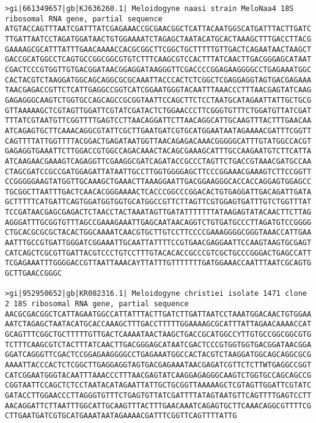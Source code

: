 \documentclass[11pt]{article}
\begin{document}
\begin{Verbatim}[commandchars=\\\{\}]
>gi|661349657|gb|KJ636260.1| Meloidogyne naasi strain MeloNaa4 18S ribosomal RNA gene, partial sequence
ATGTACCAGTTTAATCGATTTATCGAGAAACCGCGAACGGCTCATTACAATGGSCATGATTTACTTGATC
TTGATTAATCCTAGATGGATAACTGTGGAAAATCTAGAGCTAATACATGCACTAAAGCTTTGACCTTACG
GAAAAGCGCATTTATTTGAACAAAACCACGCGGCTTCGGCTGCTTTTTGTTGACTCAGAATAACTAAGCT
GACCGCATGGCCTCAGTGCCGGCGGCGTGTCTTTCAAGCGTCCACTTTATCAACTTGACGGGAGCATAAT
CGACTCCCGTGGTTGTGACGGATAACGGAGGATAAGGGTTCGACCCCGGAGAAGGGGCCTGAGAAATGGC
CACTACGTCTAAGGATGGCAGCAGGCGCGCAAATTACCCACTCTCGGCTCGAGGAGGTAGTGACGAGAAA
TAACGAGACCGTTCTCATTGAGGCCGGTCATCGGAATGGGTACAATTTAAACCCTTTAACGAGTATCAAG
GAGAGGGCAAGTCTGGTGCCAGCAGCCGCGGTAATTCCAGCTTCTCCTAATGCATAGAATTATTGCTGCG
GTTAAAAAGCTCGTAGTTGGATTCGTATCGATACTCTGGAACCCTTCGGGTGTTTCTGGATGTTATCGAT
TTTATCGTAATGTTCGGTTTTGAGTCCTTAACAGGATTCTTAACAGGCATTGCAAGTTTACTTTGAACAA
ATCAGAGTGCTTCAAACAGGCGTATTCGCTTGAATGATCGTGCATGGAATAATAGAAAACGATTTCGGTT
CAGTTTTATTGGTTTTACGGACTGAGATAATGGTTAACAGAGACAAACGGGGGCATTTGTATGGCCACGT
GAGAGGTGAAATTCTTGGACCGTGGCCAGACAAACTACAGCGAAAGCATTTGCCAAGAATGTCTTCATTA
ATCAAGAACGAAAGTCAGAGGTTCGAAGGCGATCAGATACCGCCCTAGTTCTGACCGTAAACGATGCCAA
CTAGCGATCCGCCGATGGAGATTATAATTGCCTTGGTGGGGAGCTTCCCGGAAACGAAAGTCTTCCGGTT
CCGGGGGAAGTATGGTTGCAAAGCTGAAACTTAAAGGAATTGACGGAAGGGCACCACCAGGAGTGGAGCC
TGCGGCTTAATTTGACTCAACACGGGAAAACTCACCCGGCCCGGACACTGTGAGGATTGACAGATTGATA
GCTTTTTCATGATTCAGTGGATGGTGGTGCATGGCCGTTCTTAGTTCGTGGAGTGATTTGTCTGGTTTAT
TCCGATAACGAGCGAGACTCTAACCTACTAAATAGTTGATATTTTTTTATAAGAGTATACAACTTCTTAG
AGGGATTTGCGGTGTTTAGCCGAAAGAAATTGAGCAATAACAGGTCTGTGATGCCCTTAGATGTCCGGGG
CTGCACGCGCGCTACACTGGCAAAATCAACGTGCTTGTCCTTCCCCGAAAGGGGCGGGTAAACCATTGAA
AATTTGCCGTGATTGGGATCGGAAATTGCAATTATTTTCCGTGAACGAGGAATTCCAAGTAAGTGCGAGT
CATCAGCTCGCGTTGATTACGTCCCTGTCCTTTGTACACACCGCCCGTCGCTGCCCGGGACTGAGCCATT
TCGAGAAATTTGGGGACCGTTAATTAAACAYTTATTTGTTTTTTTGATGGAAACCAATTTAATCGCAGTG
GCTTGAACCGGGC

>gi|952950652|gb|KR082316.1| Meloidogyne christiei isolate 1471 clone 2 18S ribosomal RNA gene, partial sequence
AACGCGACGGCTCATTAGAATGGCCATTATTTACTTGATCTTGATTAATCCTAAATGGACAACTGTGGAA
AATCTAGAGCTAATACATGCACCAAAGCTTTGACCTTTTTGGAAAAGCGCATTTATTAGAACAAAACCAT
GCAGTTTCGGCTGCTTTTTGTTGACTCAAAATAACTAAGCTGACCGCATGGCCYTTGTGCCGGCGGCGTG
TCTTTCAAGCGTCTACTTTATCAACTTGACGGGAGCATAATCGACTCCCGTGGTGGTGACGGATAACGGA
GGATCAGGGTTCGACTCCGGAGAAGGGGCCTGAGAAATGGCCACTACGTCTAAGGATGGCAGCAGGCGCG
AAAATTACCCACTCTCGGCTTGAGGAGGTAGTGACGAGAAATAACGAGATCGTTCTCTTWTGAGGCCGGT
CATCGGAATGGGTACAATTTAAACCCTTTAACGAGTATCAAGGAGAGGGCAAGTCTGGTGCCAGCAGCCG
CGGTAATTCCAGCTCTCCTAATACATAGAATTATTGCTGCGGTTAAAAAGCTCGTAGTTGGATTCGTATC
GATACCTTGGAACCCTTAGGGTGTTTCTGAGTGTTATCGATTTTATAGTAATGTTCAGTTTTGAGTCCTT
AACAGGATTCTTAATTTGGCATTGCAAGTTTACTTTGAACAAATCAGAGTGCTTCAAACAGGCGTTTTCG
CTTGAATGATCGTGCATGAAATAATAGAAAACGATTTCGGTTCAGTTTTATTG


\end{Verbatim}
\end{document}
